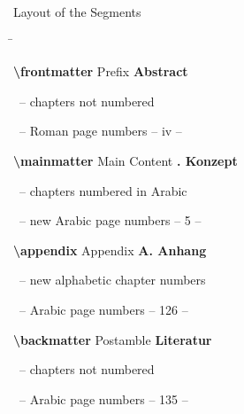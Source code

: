 \begin{frame}[fragile]{Layout of the Segments}
  \begin{tabbing}
    \hskip8cm \= \kill

    \textcolor{texcs}{\ttfamily\bfseries\textbackslash frontmatter} Prefix
        \> \textcolor{examplecolor}{\bfseries\sffamily Abstract}\\
      \strut\ \textcolor{maincolor}{--} chapters not numbered \\
      \strut\ \textcolor{maincolor}{--} Roman page numbers
        \> \textcolor{examplecolor}{\rmfamily \qquad -- iv --} \\[3ex]

    \pause

    \textcolor{texcs}{\ttfamily\bfseries\textbackslash mainmatter} Main Content
        \> \textcolor{examplecolor}{\bfseries{}. Konzept}\\
      \strut\ \textcolor{maincolor}{--} chapters numbered in Arabic\\
      \strut\ \textcolor{maincolor}{--} \alert{new} Arabic page numbers
        \> \textcolor{examplecolor}{\rmfamily \qquad -- 5 --} \\[3ex]

    \pause

    \textcolor{texcs}{\ttfamily\bfseries\textbackslash appendix} Appendix
        \> \textcolor{examplecolor}{\bfseries\sffamily A. Anhang}\\
      \strut\ \textcolor{maincolor}{--} \alert{new} alphabetic chapter numbers\\
      \strut\ \textcolor{maincolor}{--} Arabic page numbers
        \> \textcolor{examplecolor}{\rmfamily \qquad -- 126 --} \\[3ex]

    \pause

    \textcolor{texcs}{\ttfamily\bfseries\textbackslash backmatter} Postamble
        \> \textcolor{examplecolor}{\bfseries\sffamily Literatur}\\
      \strut\ \textcolor{maincolor}{--} chapters not numbered \\
      \strut\ \textcolor{maincolor}{--} Arabic page numbers
        \> \textcolor{examplecolor}{\rmfamily \qquad -- 135 --}
  \end{tabbing}
\end{frame}

